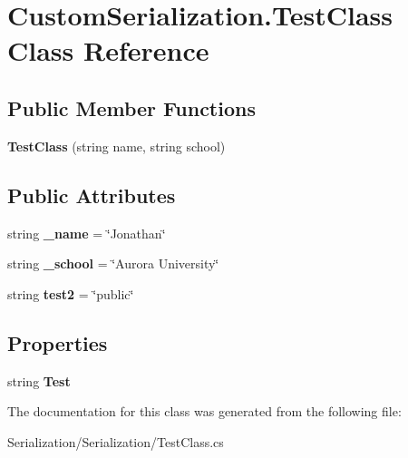 \hypertarget{class_custom_serialization_1_1_test_class}{\section{Custom\-Serialization.\-Test\-Class Class Reference}
\label{d9/d64/class_custom_serialization_1_1_test_class}
}
\subsection*{Public Member Functions}
\begin{DoxyCompactItemize}
\item 
\hypertarget{class_custom_serialization_1_1_test_class_af5e849010093442821a37ef29444b761}{{\bfseries Test\-Class} (string name, string school)}\label{d9/d64/class_custom_serialization_1_1_test_class_af5e849010093442821a37ef29444b761}

\end{DoxyCompactItemize}
\subsection*{Public Attributes}
\begin{DoxyCompactItemize}
\item 
\hypertarget{class_custom_serialization_1_1_test_class_a620913fa34517288187a3f993a7f4002}{string {\bfseries \-\_\-name} = \char`\"{}Jonathan\char`\"{}}\label{d9/d64/class_custom_serialization_1_1_test_class_a620913fa34517288187a3f993a7f4002}

\item 
\hypertarget{class_custom_serialization_1_1_test_class_aa2d507572857d89852dded978e608cbd}{string {\bfseries \-\_\-school} = \char`\"{}Aurora University\char`\"{}}\label{d9/d64/class_custom_serialization_1_1_test_class_aa2d507572857d89852dded978e608cbd}

\item 
\hypertarget{class_custom_serialization_1_1_test_class_a9df1a172a41ddf741020e071dd02bc09}{string {\bfseries test2} = \char`\"{}public\char`\"{}}\label{d9/d64/class_custom_serialization_1_1_test_class_a9df1a172a41ddf741020e071dd02bc09}

\end{DoxyCompactItemize}
\subsection*{Properties}
\begin{DoxyCompactItemize}
\item 
\hypertarget{class_custom_serialization_1_1_test_class_a11515048e0b781252bd051abd88d501f}{string {\bfseries Test}}\label{d9/d64/class_custom_serialization_1_1_test_class_a11515048e0b781252bd051abd88d501f}

\end{DoxyCompactItemize}


The documentation for this class was generated from the following file\-:\begin{DoxyCompactItemize}
\item 
Serialization/\-Serialization/Test\-Class.\-cs\end{DoxyCompactItemize}
